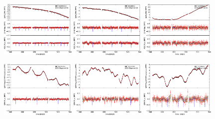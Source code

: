 \documentclass[12pt, preprint]{aastex}
\begin{document}
\begin{figure}[p]
\begin{center}
\includegraphics[width=0.32\textwidth]{f5a}
\hfill
\includegraphics[width=0.32\textwidth]{f5e}
\hfill
\includegraphics[width=0.32\textwidth]{f5f}


\includegraphics[width=0.32\textwidth]{f5g}
\hfill
\includegraphics[width=0.32\textwidth]{f5h}
\hfill
\includegraphics[width=0.32\textwidth]{f5i}



\end{center}
\end{figure}
\end{document}
